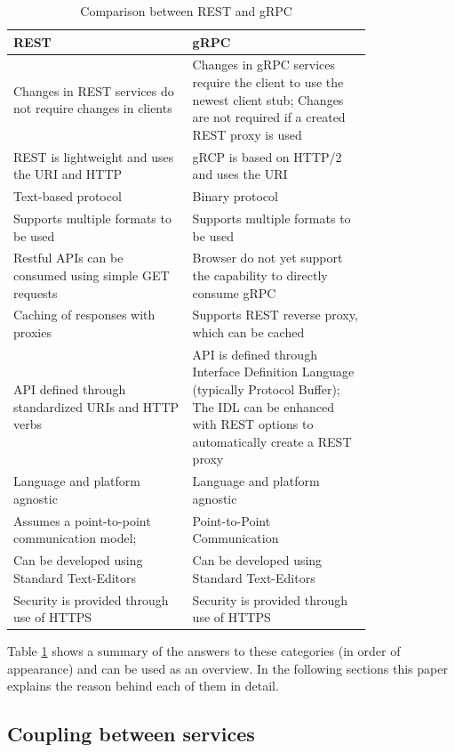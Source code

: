 \documentclass[conference]{IEEEtran}
\begin{document}
\begin{table}[!htbp]
	\centering
	\caption{Comparison between REST and gRPC}
	\label{fig:compRestGrpc}
	\begin{tabular}{| p{0.4\linewidth} | p{0.4\linewidth}|}\hline
		REST & gRPC \\\hline
		Changes in REST services do not require changes in clients & Changes in gRPC services require the client to use the newest client stub; Changes are not required if a created REST proxy is used\\\hline
		REST is lightweight and uses the URI and HTTP & gRCP is based on HTTP/2 and uses the URI\\\hline
		Text-based protocol & Binary protocol\\\hline
		Supports multiple formats to be used & Supports multiple formats to be used \\\hline
		Restful APIs can be consumed using simple GET requests & Browser do not yet support the capability to directly consume gRPC \\\hline
		Caching of responses with proxies & Supports REST reverse proxy, which can be cached\\\hline
		API defined through standardized URIs and HTTP verbs & API is defined through Interface Definition Language (typically Protocol Buffer); The IDL can be enhanced with REST options to automatically create a REST proxy \\\hline
		Language and platform agnostic & Language and platform agnostic\\\hline
		Assumes a point-to-point communication model; & Point-to-Point Communication\\\hline
		Can be developed using Standard Text-Editors & Can be developed using Standard Text-Editors\\\hline
		Security is provided through use of HTTPS & Security is provided through use of HTTPS\\\hline
	\end{tabular}
\end{table}

Table \ref{fig:compRestGrpc} shows a summary of the answers to these categories (in order of appearance) and can be used as an overview. In the following sections this paper explains the reason behind each of them in detail.

\subsection{Coupling between services}
\end{document}
